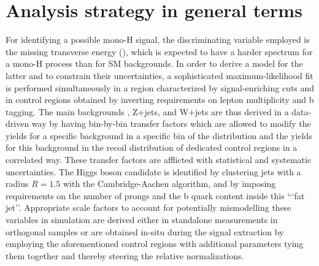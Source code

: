 \newpage
\section{Analysis strategy in general terms}

For identifying a possible mono-H signal, the discriminating variable employed is the missing transverse energy (\ptmiss), which is expected to have a harder spectrum for a mono-H process than for SM backgrounds. In order to derive a model for the latter and to constrain their uncertainties, a sophisticated maximum-likelihood fit is performed simultaneously in a region characterized by signal-enriching cuts and in control regions obtained by inverting requirements on lepton multiplicity and b tagging. The main backgrounds \ttbar, Z+jets, and W+jets are thus derived in a data-driven way by having bin-by-bin transfer factors which are allowed to modify the yields for a specific background in a specific bin of the \ptmiss distribution and the yields for this background in the recoil distribution of dedicated control regions in a correlated way. These transfer factors are afflicted with statistical and systematic uncertainties. The Higgs boson candidate is identified by clustering jets with a radius $R=1.5$ with the Cambridge-Aachen algorithm, and by imposing requirements on the number of prongs and the b quark content inside this ```fat jet''. Appropriate scale factors to account for potentially mismodelling these variables in simulation are derived either in standalone measurements in orthogonal samples or are obtained in-situ during the signal extraction by employing the aforementioned control regions with additional parameters tying them together and thereby steering the relative normalizations. 


